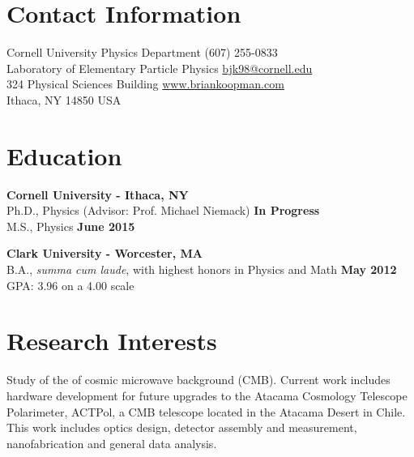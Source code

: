 \documentclass[margin,line]{res}
\begin{document}
  

\newcommand{\myname}{Brian Koopman}
\newlength{\mynamewidth}
\settowidth{\mynamewidth}{\namefont\myname}

\name{\hspace*{0.5\textwidth}\hspace{-0.5\mynamewidth} \myname \vspace*{.1in}}
\thispagestyle{empty}

\begin{resume}                        

\section{\sc Contact Information}
Cornell University Physics Department \hfill (607) 255-0833\\
Laboratory of Elementary Particle Physics \hfill \href{mailto:bjk98@cornell.edu}{bjk98@cornell.edu}\\
324 Physical Sciences Building \hfill \href{http://www.briankoopman.com}{www.briankoopman.com}\\
Ithaca, NY 14850 USA
 
\section{\sc Education}
\textbf{Cornell University - Ithaca, NY}\\
    Ph.D., Physics (Advisor: Prof. Michael Niemack) \hfill \textbf{In Progress}\\
    M.S., Physics \hfill \textbf{June 2015}

\textbf{Clark University - Worcester, MA}\\
    B.A., \textit{summa cum laude}, with highest honors in Physics and Math \hfill \textbf{May 2012}\\
    GPA: 3.96 on a 4.00 scale

\section{\sc Research Interests}
Study of the of cosmic microwave background (CMB). Current work includes
hardware development for future upgrades to the Atacama Cosmology Telescope
Polarimeter, ACTPol, a CMB telescope located in the Atacama Desert in Chile.
This work includes optics design, detector assembly and measurement,
nanofabrication and general data analysis.


\end{resume}
\end{document}
